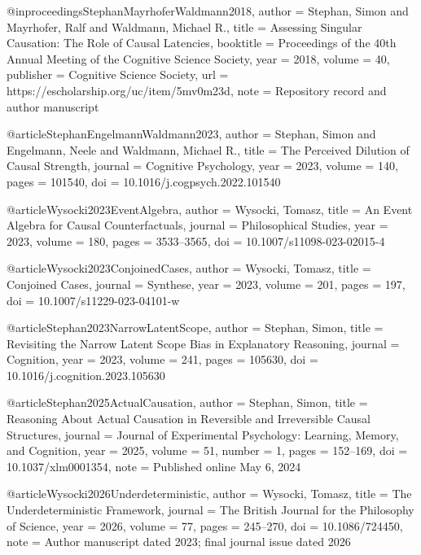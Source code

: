 
@inproceedings{StephanMayrhoferWaldmann2018,
  author    = {Stephan, Simon and Mayrhofer, Ralf and Waldmann, Michael R.},
  title     = {Assessing Singular Causation: The Role of Causal Latencies},
  booktitle = {Proceedings of the 40th Annual Meeting of the Cognitive Science Society},
  year      = {2018},
  volume    = {40},
  publisher = {Cognitive Science Society},
  url       = {https://escholarship.org/uc/item/5mv0m23d},
  note      = {Repository record and author manuscript}
}

@article{StephanEngelmannWaldmann2023,
  author  = {Stephan, Simon and Engelmann, Neele and Waldmann, Michael R.},
  title   = {The Perceived Dilution of Causal Strength},
  journal = {Cognitive Psychology},
  year    = {2023},
  volume  = {140},
  pages   = {101540},
  doi     = {10.1016/j.cogpsych.2022.101540}
}

@article{Wysocki2023EventAlgebra,
  author  = {Wysocki, Tomasz},
  title   = {An Event Algebra for Causal Counterfactuals},
  journal = {Philosophical Studies},
  year    = {2023},
  volume  = {180},
  pages   = {3533--3565},
  doi     = {10.1007/s11098-023-02015-4}
}

@article{Wysocki2023ConjoinedCases,
  author  = {Wysocki, Tomasz},
  title   = {Conjoined Cases},
  journal = {Synthese},
  year    = {2023},
  volume  = {201},
  pages   = {197},
  doi     = {10.1007/s11229-023-04101-w}
}

@article{Stephan2023NarrowLatentScope,
  author  = {Stephan, Simon},
  title   = {Revisiting the Narrow Latent Scope Bias in Explanatory Reasoning},
  journal = {Cognition},
  year    = {2023},
  volume  = {241},
  pages   = {105630},
  doi     = {10.1016/j.cognition.2023.105630}
}

@article{Stephan2025ActualCausation,
  author  = {Stephan, Simon},
  title   = {Reasoning About Actual Causation in Reversible and Irreversible Causal Structures},
  journal = {Journal of Experimental Psychology: Learning, Memory, and Cognition},
  year    = {2025},
  volume  = {51},
  number  = {1},
  pages   = {152--169},
  doi     = {10.1037/xlm0001354},
  note    = {Published online May 6, 2024}
}

@article{Wysocki2026Underdeterministic,
  author  = {Wysocki, Tomasz},
  title   = {The Underdeterministic Framework},
  journal = {The British Journal for the Philosophy of Science},
  year    = {2026},
  volume  = {77},
  pages   = {245--270},
  doi     = {10.1086/724450},
  note    = {Author manuscript dated 2023; final journal issue dated 2026}
}

